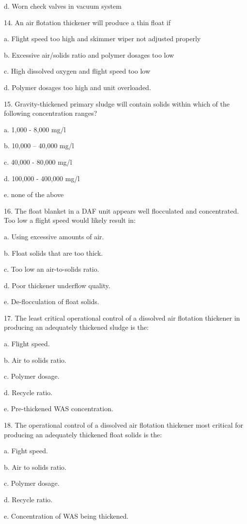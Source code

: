 \documentclass{article}
\begin{document}
d. Worn check valves in vacuum system 


14. An air flotation thickener will produce a thin float if 

a. Flight speed too high and skimmer wiper not adjusted properly 

b. Excessive air/solids ratio and polymer dosages too low 

c. High dissolved oxygen and flight speed too low 

d. Polymer dosages too high and unit overloaded. 


15. Gravity-thickened primary sludge will contain solids within which of the following concentration ranges? 

a. 1,000 - 8,000 mg/l 

b. 10,000 – 40,000 mg/l 

c. 40,000 - 80,000 mg/l 

d. 100,000 - 400,000 mg/l 

e. none of the above 


16. The float blanket in a DAF unit appears well flocculated and concentrated. Too low a flight speed would likely result in: 

a. Using excessive amounts of air. 

b. Float solids that are too thick. 

c. Too low an air-to-solids ratio. 

d. Poor thickener underflow quality. 

e. De-flocculation of float solids. 


17. The least critical operational control of a dissolved air flotation thickener in producing an adequately thickened sludge is the: 

a. Flight speed. 

b. Air to solids ratio. 

c. Polymer dosage. 

d. Recycle ratio. 

e. Pre-thickened WAS concentration. 


18. The operational control of a dissolved air flotation thickener most critical for producing an adequately thickened float solids is the: 

a. Fight speed. 

b. Air to solids ratio. 

c. Polymer dosage. 

d. Recycle ratio. 

e. Concentration of WAS being thickened. 
\end{document}
